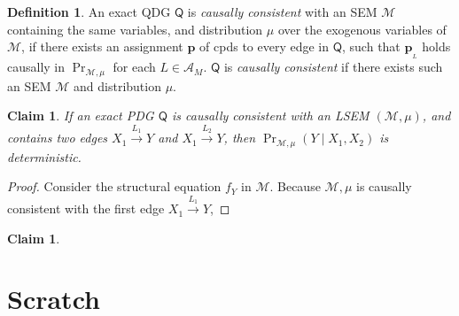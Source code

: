 \documentclass{article}
\newcommand{\bp}[1][L]{\mathbf{p}_{\!_#1\!}}
\newcommand{\N}{\mathcal N}
\newcommand{\Ar}{\mathcal A}
\newcommand{\dg}[1]{\mathsf #1}
\newcommand\mat[1]{\mathbf #1}
\theoremstyle{plain}
\newtheorem{claim}[theorem]{Claim}
\theoremstyle{definition}
\newtheorem{defn}{Definition}
\theoremstyle{remark}
\begin{document}
\begin{defn}
	An exact QDG $\dg Q$ is \emph{causally consistent} with an SEM $\mathcal M$ containing the same variables, and distribution $\mu$ over the exogenous variables of $\mathcal M$, if there exists an assignment $\mat p$ of cpds to every edge in $\dg Q$, such that  $\bp$ holds causally in $\Pr_{\mathcal M, \mu}$ for each $L \in \Ar_M$.
	$\dg Q$ is \emph{causally consistent} if there exists such an SEM $\mathcal M$ and distribution $\mu$.
\end{defn}



\begin{claim}
	If an exact PDG $\dg Q$ is causally consistent with an LSEM $(\mathcal M, \mu)$, and contains two edges $X_1 \overset{L_1}\longrightarrow Y$ and $X_1 \overset{L_2}\longrightarrow Y$, then $\Pr_{\mathcal M, \mu}(Y \mid X_1, X_2)$ is deterministic.
\end{claim}
\begin{proof}
	Consider the structural equation $f_Y$ in $\mathcal M$.
	Because $\mathcal M, \mu$ is causally consistent with the first edge $X_1 \overset{L_1}\longrightarrow Y$, 
\end{proof}


\begin{claim}
	
\end{claim}




\section*{Scratch}
\end{document}
